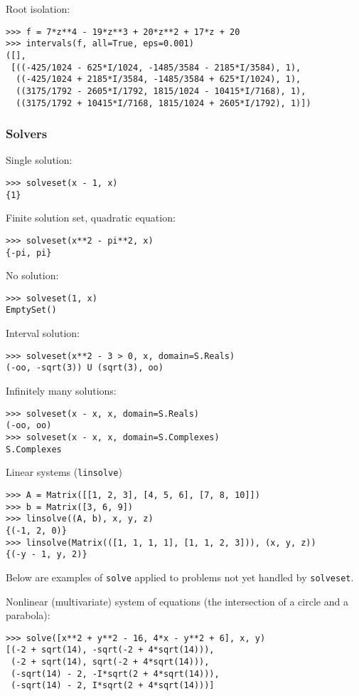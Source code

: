 \noindent Root isolation:
\begin{verbatim}
>>> f = 7*z**4 - 19*z**3 + 20*z**2 + 17*z + 20
>>> intervals(f, all=True, eps=0.001)
([],
 [((-425/1024 - 625*I/1024, -1485/3584 - 2185*I/3584), 1),
  ((-425/1024 + 2185*I/3584, -1485/3584 + 625*I/1024), 1),
  ((3175/1792 - 2605*I/1792, 1815/1024 - 10415*I/7168), 1),
  ((3175/1792 + 10415*I/7168, 1815/1024 + 2605*I/1792), 1)])
\end{verbatim}

\subsubsection{Solvers}


\noindent Single solution:
\begin{verbatim}
>>> solveset(x - 1, x)
{1}
\end{verbatim}

\noindent Finite solution set, quadratic equation:
\begin{verbatim}
>>> solveset(x**2 - pi**2, x)
{-pi, pi}
\end{verbatim}

\noindent No solution:
\begin{verbatim}
>>> solveset(1, x)
EmptySet()
\end{verbatim}

\noindent Interval solution:
\begin{verbatim}
>>> solveset(x**2 - 3 > 0, x, domain=S.Reals)
(-oo, -sqrt(3)) U (sqrt(3), oo)
\end{verbatim}

\noindent Infinitely many solutions:
\begin{verbatim}
>>> solveset(x - x, x, domain=S.Reals)
(-oo, oo)
>>> solveset(x - x, x, domain=S.Complexes)
S.Complexes
\end{verbatim}

\noindent Linear systems (\texttt{linsolve})
\begin{verbatim}
>>> A = Matrix([[1, 2, 3], [4, 5, 6], [7, 8, 10]])
>>> b = Matrix([3, 6, 9])
>>> linsolve((A, b), x, y, z)
{(-1, 2, 0)}
>>> linsolve(Matrix(([1, 1, 1, 1], [1, 1, 2, 3])), (x, y, z))
{(-y - 1, y, 2)}
\end{verbatim}

Below are examples of \texttt{solve} applied to problems not yet handled by \texttt{solveset}.

\noindent Nonlinear (multivariate) system of equations (the intersection of a circle
and a parabola):
\begin{verbatim}
>>> solve([x**2 + y**2 - 16, 4*x - y**2 + 6], x, y)
[(-2 + sqrt(14), -sqrt(-2 + 4*sqrt(14))),
 (-2 + sqrt(14), sqrt(-2 + 4*sqrt(14))),
 (-sqrt(14) - 2, -I*sqrt(2 + 4*sqrt(14))),
 (-sqrt(14) - 2, I*sqrt(2 + 4*sqrt(14)))]
\end{verbatim}

